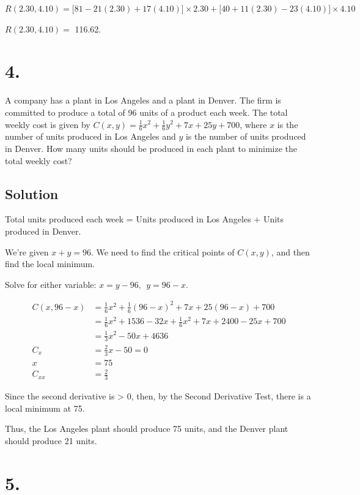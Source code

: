 \documentclass[]{article}
\begin{document}
\(R(2.30, 4.10) = \Big[81 - 21(2.30) + 17(4.10)\Big]\times 2.30 + \Big[40 + 11(2.30) - 23(4.10)\Big]\times 4.10\)

\(R(2.30, 4.10) =\) 116.62.

\hypertarget{section-3}{%
\section{4.}\label{section-3}}

A company has a plant in Los Angeles and a plant in Denver. The firm is
committed to produce a total of 96 units of a product each week. The
total weekly cost is given by
\(C(x,y) = \frac{1}{6}x^2 + \frac{1}{6}y^2 + 7x + 25y + 700\), where
\(x\) is the number of units produced in Los Angeles and \(y\) is the
number of units produced in Denver. How many units should be produced in
each plant to minimize the total weekly cost?

\hypertarget{solution-3}{%
\subsection{Solution}\label{solution-3}}

Total units produced each week = Units produced in Los Angeles + Units
produced in Denver.

We're given \(x + y = 96\). We need to find the critical points of
\(C(x,y)\), and then find the local minimum.

Solve for either variable: \(x = y - 96, \ \ y = 96 - x\).

\begin{align*}
C(x, 96 - x) &= \frac{1}{6}x^2 + \frac{1}{6}(96 - x)^2 + 7x + 25(96 - x) + 700 \\
&= \frac{1}{6}x^2 + 1536 - 32x + \frac{1}{6}x^2 + 7x + 2400 - 25x + 700 \\
&= \frac{1}{3}x^2 - 50x + 4636 \\
C_x &= \frac{2}{3}x - 50 = 0 \\
x &= 75 \\
C_{xx} &= \frac{2}{3}
\end{align*}

Since the second derivative is \textgreater{} 0, then, by the Second
Derivative Test, there is a local minimum at 75.

Thus, the Los Angeles plant should produce 75 units, and the Denver
plant should produce 21 units.

\hypertarget{section-4}{%
\section{5.}\label{section-4}}
\end{document}
